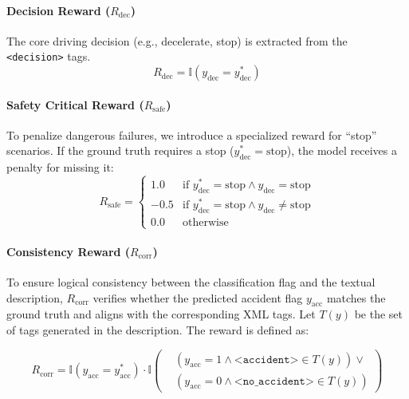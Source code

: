 \documentclass{article}
\begin{document}
\paragraph{Decision Reward ($R_{\text{dec}}$)}
The core driving decision (e.g., decelerate, stop) is extracted from the \texttt{<decision>} tags.
\begin{equation}
    R_{\text{dec}} = \mathbb{I}(y_{\text{dec}} = y^*_{\text{dec}})
\end{equation}


\paragraph{Safety Critical Reward ($R_{\text{safe}}$)}
To penalize dangerous failures, we introduce a specialized reward for ``stop'' scenarios. If the ground truth requires a stop ($y^*_{\text{dec}} = \text{stop}$), the model receives a penalty for missing it:
\begin{equation}
    R_{\text{safe}} = 
    \begin{cases} 
    1.0 & \text{if } y^*_{\text{dec}} = \text{stop} \land y_{\text{dec}} = \text{stop} \\
    -0.5 & \text{if } y^*_{\text{dec}} = \text{stop} \land y_{\text{dec}} \neq \text{stop} \\
    0.0 & \text{otherwise}
    \end{cases}
\end{equation}

\paragraph{Consistency Reward ($R_{\text{corr}}$)}
To ensure logical consistency between the classification flag and the textual description, $R_{\text{corr}}$ verifies whether the predicted accident flag $y_{\text{acc}}$ matches the ground truth and aligns with the corresponding XML tags. Let $T(y)$ be the set of tags generated in the description. The reward is defined as:

\begin{equation}
    R_{\text{corr}} = \mathbb{I}(y_{\text{acc}} = y^*_{\text{acc}}) \cdot \mathbb{I}\left( 
    \begin{aligned} 
    &(y_{\text{acc}} = 1 \land \texttt{<accident>} \in T(y)) \lor \\ 
    &(y_{\text{acc}} = 0 \land \texttt{<no\_accident>} \in T(y)) 
    \end{aligned} 
    \right)
\end{equation}
\end{document}
